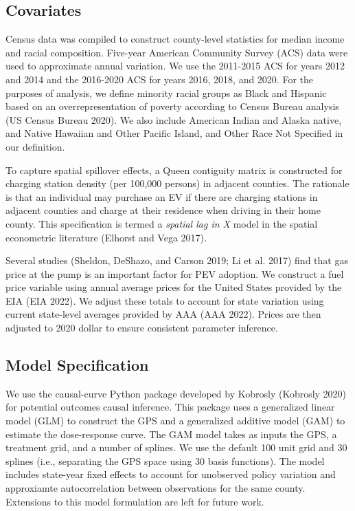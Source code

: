 \documentclass[
  letterpaper,
  DIV=11,
  numbers=noendperiod]{scrartcl}
\begin{document}
\hypertarget{covariates}{%
\subsection{Covariates}\label{covariates}}

Census data was compiled to construct county-level statistics for median
income and racial composition. Five-year American Community Survey (ACS)
data were used to approximate annual variation. We use the 2011-2015 ACS
for years 2012 and 2014 and the 2016-2020 ACS for years 2016, 2018, and
2020. For the purposes of analysis, we define minority racial groups as
Black and Hispanic based on an overrepresentation of poverty according
to Census Bureau analysis (US Census Bureau 2020). We also include
American Indian and Alaska native, and Native Hawaiian and Other Pacific
Island, and Other Race Not Specified in our definition.

To capture spatial spillover effects, a Queen contiguity matrix is
constructed for charging station density (per 100,000 persons) in
adjacent counties. The rationale is that an individual may purchase an
EV if there are charging stations in adjacent counties and charge at
their residence when driving in their home county. This specification is
termed a \emph{spatial lag in X} model in the spatial econometric
literature (Elhorst and Vega 2017)\emph{.}

Several studies (Sheldon, DeShazo, and Carson 2019; Li et al. 2017) find
that gas price at the pump is an important factor for PEV adoption. We
construct a fuel price variable using annual average prices for the
United States provided by the EIA (EIA 2022). We adjust these totals to
account for state variation using current state-level averages provided
by AAA (AAA 2022). Prices are then adjusted to 2020 dollar to ensure
consistent parameter inference.

\hypertarget{model-specification}{%
\subsection{Model Specification}\label{model-specification}}

We use the causal-curve Python package developed by Kobrosly (Kobrosly
2020) for potential outcomes causal inference. This package uses a
generalized linear model (GLM) to construct the GPS and a generalized
additive model (GAM) to estimate the dose-response curve. The GAM model
takes as inputs the GPS, a treatment grid, and a number of splines. We
use the default 100 unit grid and 30 splines (i.e., separating the GPS
space using 30 basis functions). The model includes state-year fixed
effects to account for unobserved policy variation and approxiamte
autocorrelation between observations for the same county. Extensions to
this model formulation are left for future work.
\end{document}
